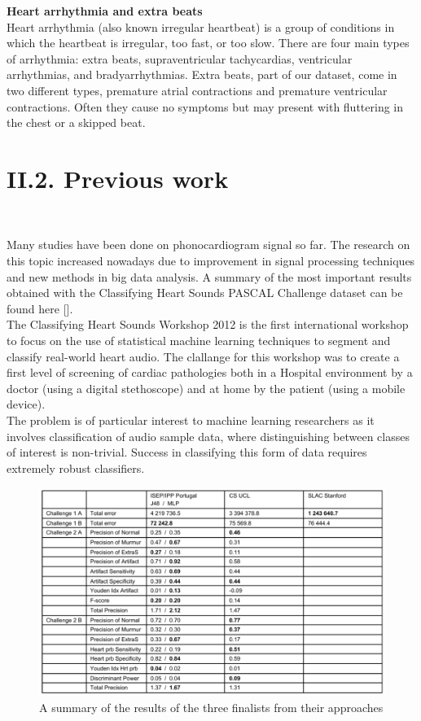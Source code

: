 \documentclass[11pt, a4papper]{report}
\theoremstyle{plain}
\theoremstyle{definition}
\theoremstyle{definition}
\theoremstyle{proposition}
\begin{document}
\textbf{Heart arrhythmia and extra beats}
\\

Heart arrhythmia (also known irregular heartbeat) is a group of conditions in which the heartbeat is irregular, too fast, or too slow. There are four main types of arrhythmia: extra beats, supraventricular tachycardias, ventricular arrhythmias, and bradyarrhythmias. Extra beats, part of our dataset, come in two different types, premature atrial contractions and premature ventricular contractions. Often they cause no symptoms but may present with fluttering in the chest or a skipped beat.
\\


\section*{II.2. Previous work}
\

Many studies have been done on phonocardiogram signal so far. The research on this topic increased nowadays due to improvement in signal processing techniques and new methods in big data analysis. A summary of the most important results obtained with the Classifying Heart Sounds PASCAL Challenge dataset can be found here [].
\\

The Classifying Heart Sounds Workshop 2012 is the first international workshop to focus on the use of statistical machine learning techniques to segment and classify real-world heart audio. The clallange for this workshop was to create a first level of screening of cardiac pathologies both in a Hospital environment by a doctor (using a digital stethoscope) and at home by the patient (using a mobile device). 
\\

The problem is of particular interest to machine learning researchers as it involves classification of audio sample data, where distinguishing between classes of interest is non-trivial. Success in classifying this form of data requires extremely robust classifiers. 
\\

\begin{figure}[h]
\includegraphics[width=16cm]{challengeresults.png}
\centering
\caption{A summary of the results of the three finalists from their approaches}
\end{figure}
\end{document}
